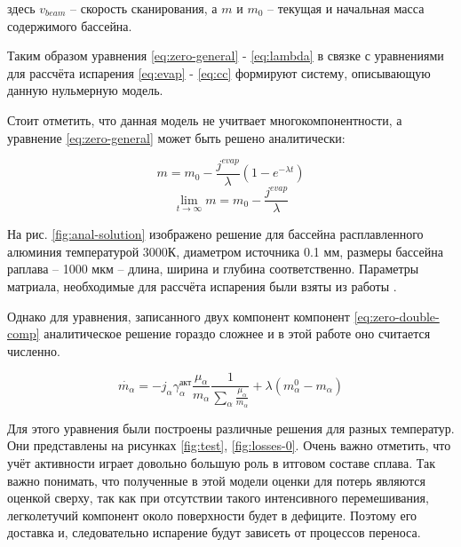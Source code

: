 \noindent
здесь $v_{beam}$ -- скорость сканирования, а $m$ и $m_0$ -- текущая и начальная масса содержимого бассейна.

Таким образом уравнения \ref{eq:zero-general} - \ref{eq:lambda} в связке с уравнениями для рассчёта испарения \ref{eq:evap} - \ref{eq:cc} формируют систему, описывающую данную нульмерную модель.

Стоит отметить, что данная модель не учитвает многокомпонентности, а уравнение \ref{eq:zero-general} может быть решено аналитически:

\begin{equation}
    m = m_0 -\frac{j^{evap}}{\lambda} (1 - e^{-\lambda t})
\end{equation}
\begin{equation}
    \lim_{t\rightarrow \infty } m = m_0 - \frac{j^{evap}}{\lambda}
\end{equation}


На рис. \ref{fig:anal-solution} изображено решение для бассейна расплавленного алюминия температурой 3000К, диаметром источника 0.1 мм, размеры бассейна раплава -- 1000 мкм -- длина, ширина и глубина соответственно. Параметры матриала, необходимые для рассчёта испарения были взяты из работы \cite{klassen2018simulation}.


Однако для уравнения, записанного двух компонент компонент  \ref{eq:zero-double-comp} аналитическое решение гораздо сложнее и в этой работе оно считается численно. 

\begin{equation}
    \label{eq:zero-double-comp}
    \dot{m_{\alpha}} = -j_{\alpha} \gamma^{\text{акт}}_{\alpha} \frac{\mu_{\alpha}}{m_{\alpha}}\frac{1}{\sum\limits_{\alpha} \frac{\mu_{\alpha}}{m_{\alpha}}} + \lambda (m_{\alpha}^0 - m_{\alpha})
\end{equation}

Для этого уравнения были построены различные решения для разных температур. Они представлены на рисунках \ref{fig:test}, \ref{fig:losses-0}. Очень важно отметить, что учёт активности играет 
довольно большую роль в итговом составе сплава. Так важно понимать, что полученные в этой модели оценки для потерь являются оценкой сверху, так как при отсутствии такого интенсивного перемешивания, легколетучий компонент около поверхности будет в дефиците. Поэтому его доставка и, следовательно испарение будут зависеть от процессов переноса.

